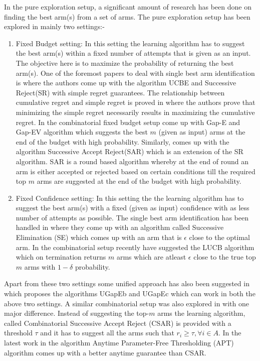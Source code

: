 	In the pure exploration setup, a significant amount of research has been done on finding the best arm(s) from a set of arms. The pure exploration setup has been explored in mainly two settings:-
\begin{enumerate}
\item Fixed Budget setting: In this setting the learning algorithm has to suggest the best arm(s) within a fixed number of attempts that is given as an input. The objective here is to maximize the probability of returning the best arm(s). One of the foremost papers to deal with single best arm identification is \cite{audibert2009exploration} where the authors come up with the algorithm UCBE and Successive Reject(SR) with simple regret guarantees. The relationship between cumulative regret and simple regret is proved in \cite{bubeck2011pure} where the authors prove that minimizing the simple regret necessarily results in maximizing the cumulative regret. In the combinatorial fixed budget setup \cite{gabillon2011multi} come up with Gap-E and Gap-EV algorithm which suggests the best $m$ (given as input) arms at the end of the budget with high probability. Similarly, \cite{bubeck2013multiple} comes up with the algorithm Successive Accept Reject(SAR) which is an extension of the SR algorithm. SAR is a round based algorithm whereby at the end of round an arm is either accepted or rejected based on certain conditions till the required top $m$ arms are suggested at the end of the budget with high probability. 
\item Fixed Confidence setting: In this setting the the learning algorithm has to suggest the best arm(s) with a fixed (given as input) confidence with as less number of attempts as possible. The single best arm identification has been handled in \cite{even2006action} where they come up with an algorithm called Successive Elimination (SE) which comes up with an arm that is $\epsilon$ close to the optimal arm. In the combinatorial setup recently \cite{kalyanakrishnan2012pac} have suggested the LUCB algorithm which on termination returns $m$ arms which are atleast $\epsilon$ close to the true top $m$ arms with $1-\delta$ probability.
\end{enumerate}	

	Apart from these two settings some unified approach has also been suggested in \cite{gabillon2012best} which proposes the algorithms UGapEb and UGapEc which can work in both the above two settings. A similar combinatorial setup was also explored in \cite{chen2014combinatorial} with one major difference. Instead of suggesting the top-$m$ arms the learning algorithm, called Combinatorial Successive Accept Reject (CSAR) is provided with a threshold $\tau$ and it has to suggest all the arms such that $r_{i}\geq \tau, \forall i\in A$. In the latest work in \cite{locatelli2016optimal} the algorithm Anytime Parameter-Free Thresholding (APT) algorithm comes up with a better anytime guarantee than CSAR.  